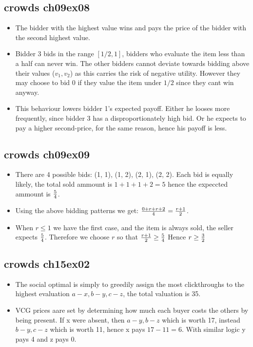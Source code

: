 \documentclass{article}
\begin{document}
\subsection{crowds ch09ex08}
\begin{itemize}
	\item The bidder with the highest value wins and pays the price of the bidder with the second highest value.
	\item Bidder 3 bids in the range $[1/2, 1]$, bidders who evaluate the item less than a half can never win.
			The other bidders cannot deviate towards bidding above their values ($v_1, v_2$) as this carries the risk of negative utility.
			However they may choose to bid 0 if they value the item under $1/2$ since they cant win anyway.
	\item This behaviour lowers bidder 1's expected payoff.
			Either he looses more frequently, since bidder 3 has a disproportionately high bid.
			Or he expects to pay a higher second-price, for the same reason, hence his payoff is less.
\end{itemize}

\subsection{crowds ch09ex09}
\begin{itemize}
	\item There are 4 possible bids: (1, 1), (1, 2), (2, 1), (2, 2).  Each bid is equally likely, the total sold ammount is $1 + 1+1+2=5$ hence the expeccted ammount is $5 \over 4$.
	\item Using the above bidding patterns we get: ${0 + r + r + 2 \over 4} = {r+1 \over 2}$.
	\item When $r \leq 1$ we have the first case, and the item is always sold, the seller expects $5 \over 4$.
			Therefore we choose $r$ so that ${r+1 \over 2} \geq {5 \over 4}$
			Hence $r \geq {3 \over 2}$
\end{itemize}

\subsection{crowds ch15ex02}
\begin{itemize}
	\item The social optimal is simply to greedily assign the most clickthroughs to the highest evaluation $a-x, b-y, c-z$, the total valuation is 35.
	\item VCG prices aare set by determining how much each buyer costs the others by being present.
			If x were absent, then $a-y, b-z$ which is worth 17, instead $b-y, c-z$ which is worth 11, hence x pays $17-11 = 6$.
			With similar logic y pays 4 and z pays 0.
\end{itemize}
\end{document}
